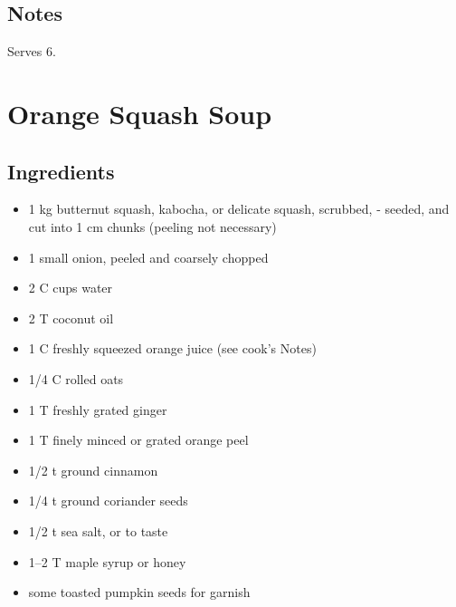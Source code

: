 \documentclass[letterpaper,10pt,english]{sphinxmanual}
\begin{document}
\section{Notes}
\label{italian_lentil_soup:notes}
Serves 6.


\chapter{Orange Squash Soup}
\label{orange_squash_soup:orange-squash-soup}\label{orange_squash_soup::doc}

\section{Ingredients}
\label{orange_squash_soup:ingredients}\begin{itemize}
\item {} 
1   kg  butternut squash, kabocha, or delicate squash, scrubbed,        - seeded, and cut into 1 cm chunks (peeling not necessary)

\item {} 
1       small onion, peeled and coarsely chopped

\item {} 
2   C   cups water

\item {} 
2   T   coconut oil

\item {} 
1   C   freshly squeezed orange juice (see cook’s Notes)

\item {} 
1/4     C   rolled oats

\item {} 
1   T   freshly grated ginger

\item {} 
1   T   finely minced or grated orange peel

\item {} 
1/2     t   ground cinnamon

\item {} 
1/4     t   ground coriander seeds

\item {} 
1/2     t   sea salt, or to taste

\item {} 
1--2 T  maple syrup or honey

\item {} 
some        toasted pumpkin seeds for garnish

\end{itemize}
\end{document}
